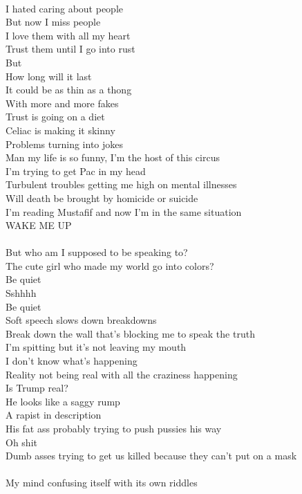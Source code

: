 \documentclass[12pt, b5paper, oneside]{book}
\begin{document}
\\I hated caring about people
\\But now I miss people
\\I love them with all my heart
\\Trust them until I go into rust
\\But
\\How long will it last
\\It could be as thin as a thong
\\With more and more fakes
\\Trust is going on a diet
\\Celiac is making it skinny
\\Problems turning into jokes
\\Man my life is so funny, I'm the host of this circus
\\I'm trying to get Pac in my head
\\Turbulent troubles getting me high on mental illnesses
\\Will death be brought by homicide or suicide
\\I'm reading Mustafif and now I'm in the same situation
\\WAKE ME UP
%
\\\\But who am I supposed to be speaking to?
\\The cute girl who made my world go into colors?
\\Be quiet
\\Sshhhh
\\Be quiet
\\Soft speech slows down breakdowns
\\Break down the wall that's blocking me to speak the truth
\\I'm spitting but it's not leaving my mouth
\\I don't know what's happening
\\Reality not being real with all the craziness happening
\\Is Trump real?
\\He looks like a saggy rump
\\A rapist in description
\\His fat ass probably trying to push pussies his way
\\Oh shit
\\Dumb asses trying to get us killed because they can't put on a mask
%
\\\\My mind confusing itself with its own riddles
\end{document}
